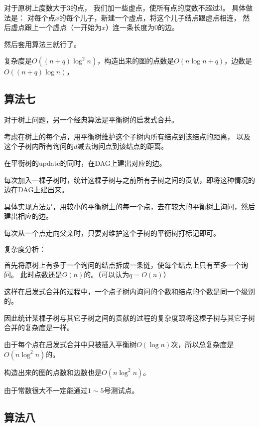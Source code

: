 \documentclass{noiassignment}
\begin{document}
对于原树上度数大于3的点，
我们加一些虚点，使所有点的度数不超过3。
具体做法是：
对每个点$x$的每个儿子，新建一个虚点，将这个儿子结点跟虚点相连，
然后虚点跟上一个虚点（一开始为$x$）连一条长度为0的边。

然后套用算法三就行了。

复杂度是$O((n+q) \log ^ 2 n)$，构造出来的图的点数是$O(n \log n + q)$，边数是$O((n+q) \log n)$，







\subsection{算法七}

对于树上问题，另一个经典算法是平衡树的启发式合并。

考虑在树上的每个点，用平衡树维护这个子树内所有结点到该结点的距离，
以及这个子树内所有询问的$d$减去询问点到该结点的距离。

在平衡树的update的同时，在DAG上建出对应的边。

每次加入一棵子树时，统计这棵子树与之前所有子树之间的贡献，即将这种情况的边在DAG上建出来。

具体实现方法是，用较小的平衡树上的每一个点，去在较大的平衡树上询问，然后建出相应的边。

每次从一个点走向父亲时，只要对维护这个子树的平衡树打标记即可。

$\textbf{复杂度分析：}$

首先将原树上有多于一个询问的结点拆成一条链，使每个结点上只有至多一个询问。
此时点数还是$O(n)$的。（可以认为$q = O(n)$）

这样在启发式合并的过程中，一个点子树内询问的个数和结点的个数是同一个级别的。

因此统计某棵子树与其它子树之间的贡献的过程的复杂度跟将这棵子树与其它子树合并的复杂度是一样。

由于每个点在启发式合并中只被插入平衡树$O(\log n)$次，所以总复杂度是$O(n \log ^ 2 n)$的。

构造出来的图的点数和边数也是$O(n \log ^ 2 n)$。

由于常数很大不一定能通过$1 \sim 5$号测试点。








\subsection{算法八}
\end{document}
